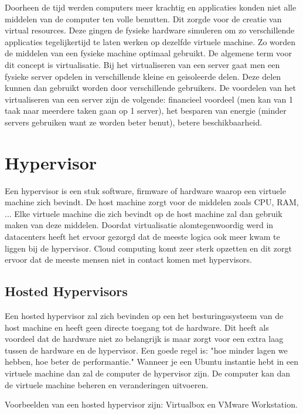 \documentclass[pdftex,a4paper,12pt,twoside]{report}
\begin{document}
Doorheen de tijd werden computers meer krachtig en applicaties konden niet alle middelen van de computer ten volle benutten. Dit zorgde voor de creatie van virtual resources. Deze gingen de fysieke hardware simuleren om zo verschillende applicaties tegelijkertijd te laten werken op dezelfde virtuele machine. Zo worden de middelen van een fysieke machine optimaal gebruikt. De algemene term voor dit concept is virtualisatie. Bij het virtualiseren van een server gaat men een fysieke server opdelen in verschillende kleine en geisoleerde delen. Deze delen kunnen dan gebruikt worden door verschillende gebruikers. De voordelen van het virtualiseren van een server zijn de volgende: financieel voordeel (men kan van 1 taak naar meerdere taken gaan op 1 server), het besparen van energie (minder servers gebruiken want ze worden beter benut), betere beschikbaarheid.

\section{Hypervisor}

Een hypervisor is een stuk software, firmware of hardware waarop een virtuele machine zich bevindt. De host machine zorgt voor de middelen zoals CPU, RAM, ... Elke virtuele machine die zich bevindt op de host machine zal dan gebruik maken van deze middelen. Doordat virtualisatie alomtegenwoordig werd in datacenters heeft het ervoor gezorgd dat de meeste logica ook meer kwam te liggen bij de hypervisor. Cloud computing komt zeer sterk opzetten en dit zorgt ervoor dat de meeste mensen niet in contact komen met hypervisors.

\subsection{Hosted Hypervisors}

Een hosted hypervisor zal zich bevinden op een het besturingssysteem van de host machine en heeft geen directe toegang tot de hardware. Dit heeft als voordeel dat de hardware niet zo belangrijk is maar zorgt voor een extra laag tussen de hardware en de hypervisor. Een goede regel is: "hoe minder lagen we hebben, hoe beter de performantie." Wanneer je een Ubuntu instantie hebt in een virtuele machine dan zal de computer de hypervisor zijn. De computer kan dan de virtuele machine beheren en veranderingen uitvoeren.

Voorbeelden van een hosted hypervisor zijn: Virtualbox en VMware Workstation.
\end{document}
